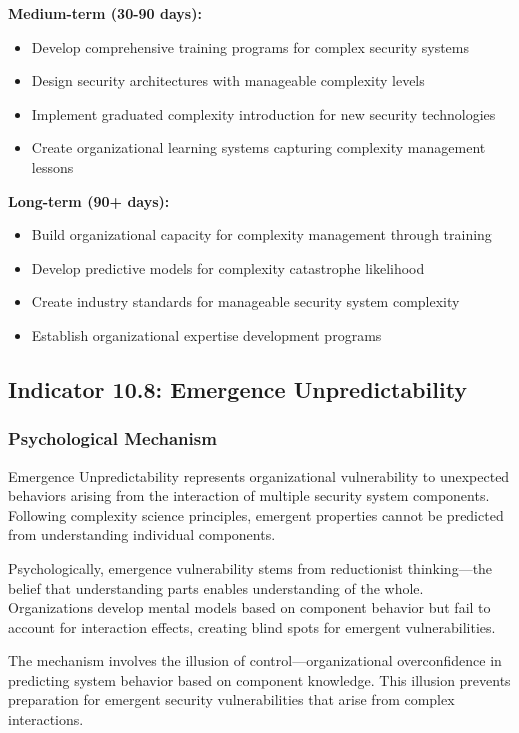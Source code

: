 \documentclass[11pt,a4paper]{article}
\begin{document}
\textbf{Medium-term (30-90 days):}
\begin{itemize}
\item Develop comprehensive training programs for complex security systems
\item Design security architectures with manageable complexity levels
\item Implement graduated complexity introduction for new security technologies
\item Create organizational learning systems capturing complexity management lessons
\end{itemize}

\textbf{Long-term (90+ days):}
\begin{itemize}
\item Build organizational capacity for complexity management through training
\item Develop predictive models for complexity catastrophe likelihood
\item Create industry standards for manageable security system complexity
\item Establish organizational expertise development programs
\end{itemize}

\subsection{Indicator 10.8: Emergence Unpredictability}

\subsubsection{Psychological Mechanism}

Emergence Unpredictability represents organizational vulnerability to unexpected behaviors arising from the interaction of multiple security system components. Following complexity science principles\cite{holland1995}, emergent properties cannot be predicted from understanding individual components.

Psychologically, emergence vulnerability stems from reductionist thinking—the belief that understanding parts enables understanding of the whole. Organizations develop mental models based on component behavior but fail to account for interaction effects, creating blind spots for emergent vulnerabilities.

The mechanism involves the illusion of control\cite{langer1975}—organizational overconfidence in predicting system behavior based on component knowledge. This illusion prevents preparation for emergent security vulnerabilities that arise from complex interactions.
\end{document}
